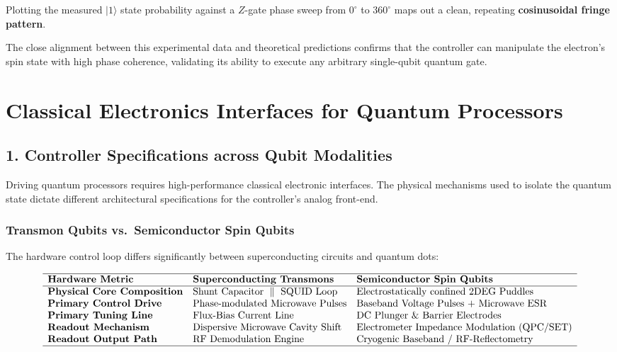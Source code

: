 \documentclass[
]{article}
\begin{document}
Plotting the measured \(|1\rangle\) state probability against a
\(Z\)-gate phase sweep from \(0^\circ\) to \(360^\circ\) maps out a
clean, repeating \textbf{cosinusoidal fringe pattern}.

The close alignment between this experimental data and theoretical
predictions confirms that the controller can manipulate the electron's
spin state with high phase coherence, validating its ability to execute
any arbitrary single-qubit quantum gate.

\section{Classical Electronics Interfaces for Quantum
Processors}\label{classical-electronics-interfaces-for-quantum-processors}

\subsection{1. Controller Specifications across Qubit
Modalities}\label{controller-specifications-across-qubit-modalities}

Driving quantum processors requires high-performance classical
electronic interfaces. The physical mechanisms used to isolate the
quantum state dictate different architectural specifications for the
controller's analog front-end.

\subsubsection{Transmon Qubits vs.~Semiconductor Spin
Qubits}\label{transmon-qubits-vs.-semiconductor-spin-qubits}

The hardware control loop differs significantly between superconducting
circuits and quantum dots:

\[\begin{array}{lll}
\hline
\textbf{Hardware Metric} & \textbf{Superconducting Transmons} & \textbf{Semiconductor Spin Qubits} \\ \hline
\textbf{Physical Core Composition} & \text{Shunt Capacitor } \parallel \text{ SQUID Loop} & \text{Electrostatically confined 2DEG Puddles} \\
\textbf{Primary Control Drive} & \text{Phase-modulated Microwave Pulses} & \text{Baseband Voltage Pulses + Microwave ESR} \\
\textbf{Primary Tuning Line} & \text{Flux-Bias Current Line} & \text{DC Plunger \& Barrier Electrodes} \\
\textbf{Readout Mechanism} & \text{Dispersive Microwave Cavity Shift} & \text{Electrometer Impedance Modulation (QPC/SET)} \\
\textbf{Readout Output Path} & \text{RF Demodulation Engine} & \text{Cryogenic Baseband / RF-Reflectometry} \\ \hline
\end{array}\]
\end{document}
